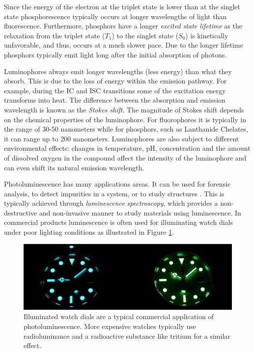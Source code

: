 \documentclass[thesis.tex]{subfiles}
\begin{document}
Since the energy of the electron at the triplet state is lower than at the singlet state phosphorescence typically occurs at longer wavelengths of light than fluorescence. Furthermore, phosphors have a longer \emph{excited state lifetime} as the relaxation from the triplet state ($T_1$) to the singlet state ($S_0$) is kinetically unfavorable, and thus, occurs at a much slower pace. Due to the longer lifetime phosphors typically emit light long after the initial absorption of photons. \cite{CEJ}

Luminophores always emit longer wavelengths (less energy) than what they absorb. This is due to the loss of energy within the emission pathway. For example, during the IC and ISC transitions some of the excitation energy transforms into heat. The difference between the absorption and emission wavelength is known as the \emph{Stokes shift}. The magnitude of Stokes shift depends on the chemical properties of the luminophore. For fluorophores it is typically in the range of 30-50 nanometers while for phosphors, such as Lanthanide Chelates, it can range up to 200 nanometers. Luminophores are also subject to different environmental effects: changes in temperature, pH, concentration and the amount of dissolved oxygen in the compound affect the intensity of the luminophore and can even shift its natural emission wavelength. \cite{luminescence_basics}\cite{hemmila}

Photoluminescence has many applications areas. It can be used for forensic analysis, to detect impurities in a system, or to study structures \cite{photoluminescence_use_case_2}\cite{photoluminescence_use_case_1}\cite{photoluminescence_use_case_3}. This is typically achieved through \emph{luminescence spectroscopy}, which provides a non-destructive and non-invasive manner to study materials using luminescence. In commercial products luminescence is often used for illuminating watch dials under poor lighting conditions as illustrated in Figure \ref{figure:photoluminescence_example}.

\begin{figure}[h!]
\centering \includegraphics[width=\textwidth]{images/photoluminescence_example}
\caption{Illuminated watch dials are a typical commercial application of photoluminescence. More expensive watches typically use radioluminance and a radioactive substance like tritium for a similar effect.\label{figure:photoluminescence_example}}
\end{figure}
\end{document}
